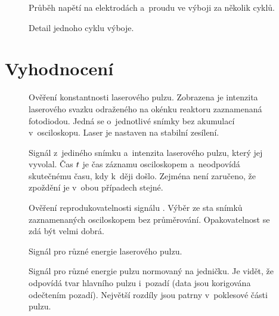 \begin{figure}[htp]
	\centering
	
	\caption{Průběh napětí na elektrodách a~proudu ve výboji
		za několik cyklů.}
	\label{fig:efish-overview-full}
	\vspace{24pt}
	
	\caption{Detail jednoho cyklu výboje.}
	\label{fig:efish-overview-period}
\end{figure}

\section{Vyhodnocení}
\label{sec:efish-method}

\begin{figure}[htp]
	\centering
	
	\caption{Ověření konstantnosti laserového pulzu.
		Zobrazena je intenzita laserového svazku odraženého
		na okénku reaktoru zaznamenaná fotodiodou.
		Jedná se o~jednotlivé snímky bez akumulací v~osciloskopu.
		Laser je nastaven na stabilní zesílení.}
	\label{fig:efish-pulse-compare}
\end{figure}

\begin{figure}[htp]
	\centering
	
	\caption{Signál \EFISH{} z~jediného snímku
		a~intenzita laserového pulzu, který jej vyvolal.
		Čas $t$ je čas záznamu osciloskopem a~neodpovídá skutečnému času,
		kdy k~ději došlo.
		Zejména není zaručeno, že zpoždění je v~obou případech stejné.}
	\label{fig:efish-singleshot}
\end{figure}

\begin{figure}[htp]
	\centering
	
	\caption{Ověření reprodukovatelnosti signálu \EFISH{}.
		Výběr ze sta snímků zaznamenaných osciloskopem bez průměrování.
		Opakovatelnost se zdá být velmi dobrá.}
	\label{fig:efish-singleshots-compare}
\end{figure}


\begin{figure}[htp]
	\centering
	
	\caption{Signál \EFISH{} pro různé energie laserového pulzu.}
	\label{fig:efish-energy-corrected}
	\vspace{24pt}
	
	\caption{Signál \EFISH{} pro různé energie pulzu normovaný na jedničku.
		Je vidět, že odpovídá tvar hlavního pulzu i~pozadí
		(data jsou korigována odečtením pozadí).
		Největší rozdíly jsou patrny v~poklesové části pulzu.}
	\label{fig:efish-energy-norm}
\end{figure}

